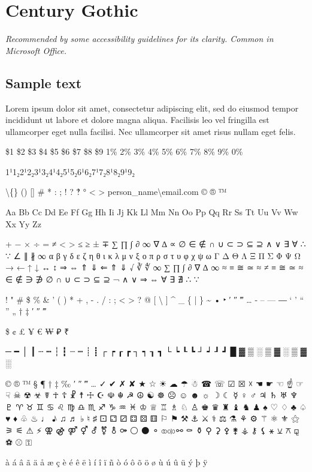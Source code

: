 \section{Century Gothic}
\emph{Recommended by some accessibility guidelines for its clarity. Common in Microsoft Office.}
\begin{raggedright}
\section*{Sample text}
Lorem ipsum dolor sit amet, consectetur adipiscing elit, sed do eiusmod tempor incididunt ut labore et dolore magna aliqua. Facilisis leo vel fringilla est ullamcorper eget nulla facilisi. Nec ullamcorper sit amet risus nullam eget felis.

\$1 \$2 \$3 \$4 \$5 \$6 \$7 \$8 \$9 1\% 2\% 3\% 4\% 5\% 6\% 7\% 8\% 9\% 0\%

1¹1₂2¹2₂3¹3₂4¹4₂5¹5₂6¹6₂7¹7₂8¹8₂9¹9₂

\textbackslash\{\} () [] \# * : ; ! ? ‽ ° \textless{} \textgreater{} person\_name\textbackslash{}email.com © ® ™

Aa Bb Cc Dd Ee Ff Gg Hh Ii Jj Kk Ll Mm Nn Oo Pp Qq Rr Ss Tt Uu Vv Ww Xx Yy Zz

+ − × ÷ = ≠ < > ≤ ≥ ± ∓
∑ ∏ ∫ ∂ ∞ ∇ ∆ ∝ ∅ ∈ ∉ ∩ ∪ ⊂ ⊃ ⊆ ⊇ ∧ ∨ ∃ ∀ ∴ ∵ ∠ ∥ ∦ ∞
α β γ δ ε ζ η θ ι κ λ μ ν ξ ο π ρ σ τ υ φ χ ψ ω
Γ Δ Θ Λ Ξ Π Σ Φ Ψ Ω
→ ← ↑ ↓ ↔ ↕ ⇒ ⇔ ⇑ ⇓ ⇐ ⇑ ⇓
√ ∛ ∜ ∞ ∑ ∏ ∫ ∂ ∇ ∆ ∞ ≈ ≡ ≅ ≃ ≈ ≠ ≡ ≅ ≃ ≈
∈ ∉ ∋ ∌ ∅ ∩ ∪ ⊂ ⊃ ⊆ ⊇
¬ ∧ ∨ ⇒ ⇔ ∀ ∃ ∄ ∴ ∵

! " \# \$ \% \& ' ( ) * + , - . / : ; \textless{} \textgreater{} ? @ [ \textbackslash{} ] \^{} \_ \{ | \} \~{}
• ‣ ′ ″ ‴ … ‐ – — ― ‘ ’ “ ” „ † ‡ ′ ″ ‴

\$ ¢ £ ¥ € ₩ ₽ ₹

─ ━ │ ┃ ┄ ┅ ┆ ┇ ┈ ┉ ┊ ┋ ┌ ┍ ┎ ┏ ┐ ┑ ┒ ┓ └ ┕ ┖ ┗ ┘ ┙ ┚ ┛
█ ▓ ▒ ░ ▒ ▓ ░ ▒ ▓ ░

© ® ™ § ¶ † ‡ ‰ ′ ″ ‴ … ✓ ✔ ✗ ✘ ★ ☆ ☀ ☁ ☂ ☃ ☎ ☏ ☑ ☒ ☓ ☚ ☛ ☜ ☝ ☞ ☟ ☠ ☢ ☣ ☤ ☥ ☦ ☧ ☨ ☩ ☪ ☫ ☬ ☭ ☮ ☯ ☸ ☹ ☺ ☻ ☼ ☽ ☾ ☿ ♀ ♂ ♃ ♄ ♅ ♆ ♇ ♈ ♉ ♊ ♋ ♌ ♍ ♎ ♏ ♐ ♑ ♒ ♓ ♔ ♕ ♖ ♗ ♘ ♙ ♚ ♛ ♜ ♝ ♞ ♟ ♠ ♡ ♢ ♣ ♤ ♥ ♦ ♧ ♨ ♩ ♪ ♫ ♬ ♭ ♮ ♯ ⚀ ⚁ ⚂ ⚃ ⚄ ⚅ ⚐ ⚑ ⚒ ⚓ ⚔ ⚕ ⚖ ⚗ ⚘ ⚙ ⚚ ⚛ ⚜ ⚝ ⚞ ⚟ ⚠ ⚡ ⚢ ⚣ ⚤ ⚥ ⚦ ⚧ ⚨ ⚩ ⚪ ⚫ ⚬ ⚭ ⚮ ⚯ ⚰ ⚱ ⚲ ⚳ ⚴ ⚵ ⚶ ⚷ ⚸ ⚹ ⚺ ⚻ ⚼ ⚽ ⚾ ⚿

à á â ã ä å æ ç è é ê ë ì í î ï ñ ò ó ô õ ö ø ù ú û ü ý þ ÿ
\end{raggedright}
